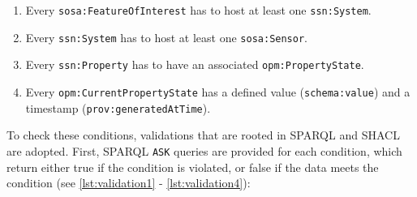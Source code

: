 \begin{enumerate}
    \item 
    Every \texttt{sosa:FeatureOfInterest} has to host at least one \texttt{ssn:System}.

    \item 
    Every \texttt{ssn:System} has to host at least one \texttt{sosa:Sensor}.

    \item 
    Every \texttt{ssn:Property} has to have an associated \texttt{opm:PropertyState}.

    \item 
    Every \texttt{opm:CurrentPropertyState} has a defined value (\texttt{schema:value}) and a timestamp (\texttt{prov:generatedAtTime}).
\end{enumerate}
 
\noindent To check these conditions, validations that are rooted in \ac{SPARQL} and \ac{SHACL} are adopted. First, \ac{SPARQL} \texttt{ASK} queries are provided for each condition, which return either true if the condition is violated, or false if the data meets the condition (see \autoref{lst:validation1} - \autoref{lst:validation4}):

